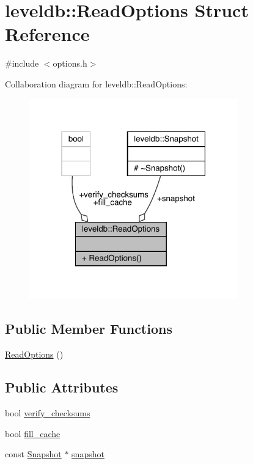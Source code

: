 \hypertarget{structleveldb_1_1_read_options}{}\section{leveldb\+::Read\+Options Struct Reference}
\label{structleveldb_1_1_read_options}


{\ttfamily \#include $<$options.\+h$>$}



Collaboration diagram for leveldb\+::Read\+Options\+:
\nopagebreak
\begin{figure}[H]
\begin{center}
\leavevmode
\includegraphics[width=256pt]{structleveldb_1_1_read_options__coll__graph}
\end{center}
\end{figure}
\subsection*{Public Member Functions}
\begin{DoxyCompactItemize}
\item 
\mbox{\hyperlink{structleveldb_1_1_read_options_a6bf119f5a33b0d0a70fb60d8114351ef}{Read\+Options}} ()
\end{DoxyCompactItemize}
\subsection*{Public Attributes}
\begin{DoxyCompactItemize}
\item 
bool \mbox{\hyperlink{structleveldb_1_1_read_options_a43731d67b707995e20571ad33c1f53f2}{verify\+\_\+checksums}}
\item 
bool \mbox{\hyperlink{structleveldb_1_1_read_options_a49f3754f8838596148ed5cbf9bbf8664}{fill\+\_\+cache}}
\item 
const \mbox{\hyperlink{classleveldb_1_1_snapshot}{Snapshot}} $\ast$ \mbox{\hyperlink{structleveldb_1_1_read_options_a1fa3fffc267dff89fce7c39d7c7b5b50}{snapshot}}
\end{DoxyCompactItemize}


